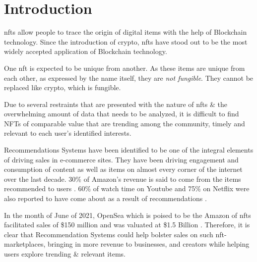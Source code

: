 \documentclass[manuscript,natbib=false, anonymous]{acmart}
\begin{document}
\section{Introduction}


\gls{nft}s allow people to trace the origin of digital items with the help of Blockchain technology. Since the introduction of crypto, \gls{nft}s have stood out to be the most widely accepted application of Blockchain technology.

One \gls{nft} is expected to be unique from another. As these items are unique from each other, as expressed by the name itself, they are \textit{not fungible}. They cannot be replaced like crypto, which is fungible.

Due to several restraints that are presented with the nature of \gls{nft}s \& the overwhelming amount of data that needs to be analyzed, it is difficult to find NFTs of comparable value that are trending among the community, timely and relevant to each user’s identified interests.

Recommendations Systems have been identified to be one of the integral elements of driving sales in e-commerce sites. They have been driving engagement and consumption of content as well as items on almost every corner of the internet over the last decade. 30\% of Amazon's revenue is said to come from the items recommended to users \cite{naumovDeepLearningRecommendation2019}. 60\% of watch time on Youtube and 75\% on Netflix were also reported to have come about as a result of recommendations \cite{RecommendationsWhatWhy, vanderbiltScienceNetflixAlgorithms}.

In the month of June of 2021, OpenSea which is poised to be the Amazon of \gls{nft}s facilitated sales of \$150 million and was valuated at \$1.5 Billion \cite{hackettThisCryptoMarketplace2021, dfinzerAnnouncingOur100M2021, chevetBlockchainTechnologyNonFungible2018}. Therefore, it is clear that Recommendation Systems could help bolster sales on such \gls{nft}-marketplaces, bringing in more revenue to businesses, and creators while helping users explore trending \& relevant items.
\end{document}
